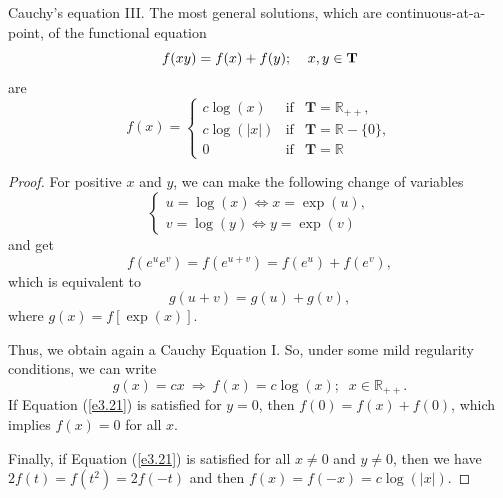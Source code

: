 \documentclass[
	11pt, %
	fleqn, %
	a4paper, %
]{LegrandOrangeBook}
\newcommand{\R}{\mathbb{R}}
\begin{document}
\begin{theorem}{Cauchy's equation III. }\label{th2.7} The most general solutions, which are
continuous-at-a-point, of the functional equation
\begin{equation}\label{e3.21}
f(xy)=f(x)+f(y);\;\;\;\;x,y \in {\bf T}
\end {equation}
are
\begin{equation}
f(x)=\left\{ \begin{array}{lll}
c\log(x) & \text{if} & \mathbf{T}=\mathbb{R}_{++},\\
c\log(|x|) & \text{if} & \mathbf{T}=\mathbb{R}-\{0\},\\
0 & \text{if} & \mathbf{T}=\mathbb{R}
\end{array} \right.
\end{equation}
\end{theorem}
\begin{proof}
For positive $x$ and $y$, we can make
the following change of variables
\begin{equation}
\left\{ \begin{array}{l}
u=\log(x) \Leftrightarrow x=\exp(u),\\
v=\log(y) \Leftrightarrow y=\exp(v)
\end{array} \right.
\end {equation}
and get
\begin{equation}
f(e^ue^v)=f(e^{u+v})=f(e^u)+f(e^v),
\end {equation}
which is equivalent to
\begin{equation}
g(u+v)=g(u)+g(v),
\end {equation}
where $g(x)=f[\exp(x)]$.

Thus, we obtain again a Cauchy Equation I.
So, under some mild regularity conditions, we can write
\begin{equation}
g(x)=cx\  \Rightarrow \  f(x)=c\log(x);\;\;x\in \R _{++}.
\end {equation}
If Equation (\ref{e3.21}) is satisfied for $y=0$, then
$f(0)=f(x)+f(0)$, which implies $f(x)=0$ for all $x$.

Finally, if Equation (\ref{e3.21}) is satisfied for all $x\ne 0$ and $y\ne 0$, then we have $2
f(t)=f(t^2)=2 f(-t)$ and then $f(x)=f(-x)=c\log(|x|)$.
\end{proof}
\end{document}
